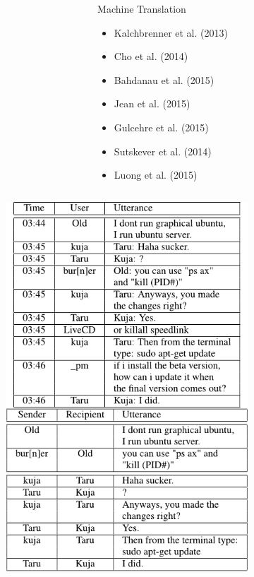 \documentclass{beamer}
\begin{document}
\begin{frame}
\begin{figure}
\begin{minipage}[t][7cm][t]{\textwidth}
\begin{overprint}
\begin{columns}
\begin{column}{0.6\textwidth}
\begin{figure}[ht]
							\end{figure}
						\end{column}
						\begin{column}{0.4\textwidth}
							\begin{block}{Machine Translation}
								\begin{itemize}
									\item Kalchbrenner et al. (2013) 
									\item Cho et al. (2014)
									\item Bahdanau et al. (2015)
									\item Jean et al. (2015)
									\item Gulcehre et al. (2015)
									\item Sutskever et al. (2014)
									\item Luong et al. (2015)
								\end{itemize}
							\end{block}
						\end{column}
					\end{columns}
					\onslide<4>
					\begin{columns}
						\begin{column}{0.6\textwidth}
							\begin{figure}[ht]
								\centering
								\includegraphics[width=0.6\linewidth]{images/cm}
								\label{fig:cm}
								

\end{figure}
\end{column}
\end{columns}
\end{overprint}
\end{minipage}
\end{figure}
\end{frame}
\end{document}
